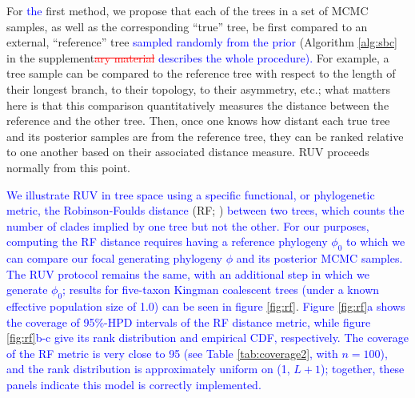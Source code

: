 \documentclass[oneside]{article}
\begin{document}
For \textcolor{blue}{the} first method, we propose that each of the trees in a set of MCMC samples, as well as the corresponding ``true'' tree, be first compared to an external, ``reference'' tree \textcolor{blue}{sampled randomly from the prior} (Algorithm \ref{alg:sbc} in the supplement\textcolor{red}{\st{ary material}}\textcolor{blue}{ describes the whole procedure).}
For example, a tree sample can be compared to the reference tree with respect to the length of their longest branch, to their topology, to their asymmetry, etc.;
what matters here is that this comparison quantitatively measures the distance between the reference and the other tree.
Then, once one knows how distant each true tree and its posterior samples are from the reference tree, they can be ranked relative to one another based on their associated distance measure.
RUV proceeds normally from this point.

\textcolor{blue}{We illustrate RUV in tree space using a specific functional, or phylogenetic metric, the Robinson-Foulds distance} (RF; \citealp{foulds81})
\textcolor{blue}{ between two trees, which counts the number of clades implied by one tree but not the other.}
\textcolor{blue}{For our purposes, computing the RF distance requires having a reference phylogeny $\phi_0$ to which we can compare our focal generating phylogeny $\phi$ and its posterior MCMC samples.
The RUV protocol remains the same, with an additional step in which we generate $\phi_0$;
results for five-taxon Kingman coalescent trees (under a known effective population size of 1.0) can be seen in figure} \ref{fig:rf}.
\textcolor{blue}{Figure \ref{fig:rf}a shows the coverage of 95\%-HPD intervals of the RF distance metric, while figure \ref{fig:rf}b-c give its rank distribution and empirical CDF, respectively.
The coverage of the RF metric is very close to 95 (see Table \ref{tab:coverage2}, with $n=100$), and the rank distribution is approximately uniform on (1, $L+1$); together, these panels indicate this model is correctly implemented.}
\end{document}
